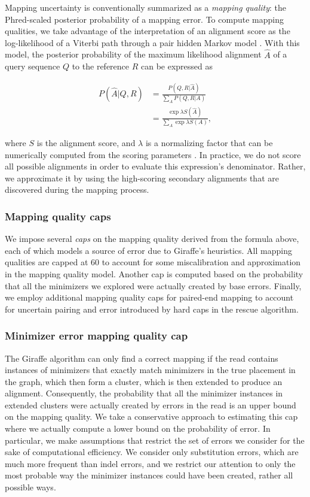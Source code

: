 \documentclass[11pt]{ucscthesis}
\newcommand{\vocab}[1]{\emph{#1}}
\begin{document}
Mapping uncertainty is conventionally summarized as a \vocab{mapping quality}: the Phred-scaled\cite{ewing1998base} posterior probability of a mapping error. To compute mapping qualities, we take advantage of the interpretation of an alignment score as the log-likelihood of a Viterbi path through a pair hidden Markov model \cite{durbin1998biological}. With this model, the posterior probability of the maximum likelihood alignment $\hat A$ of a query sequence $Q$ to the reference $R$ can be expressed as

\begin{align}
    P(\hat A| Q, R) &= \frac{P(Q, R | \hat A)}{\sum_A P(Q,R|A)} \nonumber \\
    &= \frac{\exp \lambda S(\hat A)}{\sum_A \exp \lambda S(A)}, \nonumber
\end{align}

\noindent where $S$ is the alignment score, and $\lambda$ is a normalizing factor that can be numerically computed from the scoring parameters \cite{karlin1990methods}. In practice, we do not score all possible alignments in order to evaluate this expression's denominator. Rather, we approximate it by using the high-scoring secondary alignments that are discovered during the mapping process.



\subsubsection{Mapping quality caps}

We impose several \vocab{caps} on the mapping quality derived from the formula above, each of which models a source of error due to Giraffe's heuristics.
All mapping qualities are capped at 60 to account for some miscalibration and approximation in the mapping quality model.
Another cap is computed based on the probability that all the minimizers we explored were actually created by base errors.
Finally, we employ additional mapping quality caps for paired-end mapping to account for uncertain pairing and error introduced by hard caps in the rescue algorithm.

\subsubsection{Minimizer error mapping quality cap}

The Giraffe algorithm can only find a correct mapping if the read contains instances of minimizers that exactly match minimizers in the true placement in the graph, which then form a cluster, which is then extended to produce an alignment. 
Consequently, the probability that all the minimizer instances in extended clusters were actually created by errors in the read is an upper bound on the mapping quality.
We take a conservative approach to estimating this cap where we actually compute a lower bound on the probability of error. 
In particular, we make assumptions that restrict the set of errors we consider for the sake of computational efficiency.
We consider only substitution errors, which are much more frequent than indel errors, and we restrict our attention to only the most probable way the minimizer instances could have been created, rather all possible ways. 
\end{document}
